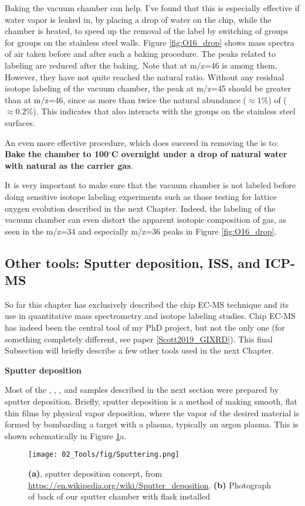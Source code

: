 Baking the vacuum chamber can help. I've found that this is especially effective if water vapor is leaked in, by placing a drop of water on the chip, while the chamber is heated, to speed up the removal of the  label by switching of  groups for  groups on the stainless steel walls. Figure \ref{fig:O16_drop} shows mass spectra of air taken before and after such a baking procedure. The peaks related to  labeling are reduced after the baking. Note that  at m/z=46 is among them. However, they have not quite reached the natural ratio. Without any residual isotope labeling of the vacuum chamber, the peak at m/z=45 should be greater than at m/z=46, since  as more than twice the natural abundance ($\approx 1$\%) of  ($\approx 0.2$\%). This indicates that  also interacts with the  groups on the stainless steel surfaces. 

An even more effective procedure, which does succeed in removing the  is to: \textbf{Bake the chamber to 100$^\circ$C overnight under a drop of natural water with natural  as the carrier gas}. 

It is very important to make sure that the vacuum chamber is not labeled before doing sensitive isotope labeling experiments such as those testing for lattice oxygen evolution described in the next Chapter. Indeed, the labeling of the vacuum chamber can even distort the apparent isotopic composition of  gas, as seen in the m/z=34 and especially m/z=36 peaks in Figure \ref{fig:O16_drop}.

\subsection{Other tools: Sputter deposition, ISS, and ICP-MS}\label{subsec:other_tools}

So far this chapter has exclusively described the chip EC-MS technique and its use in quantitative mass spectrometry and isotope labeling studies. Chip EC-MS has indeed been the central tool of my PhD project, but not the only one (for something completely different, see paper \ref{Scott2019_GIXRD}). This final Subsection will briefly describe a few other tools used in the next Chapter.

\vspace{5mm}
\textbf{Sputter deposition}

Most of the , , , and  samples described in the next section were prepared by sputter deposition. Briefly, sputter deposition is a method of making smooth, flat thin films by physical vapor deposition, where the vapor of the desired material is formed by bombarding a target with a plasma, typically an argon plasma. This is shown schematically in Figure \ref{fig:sputter}a. 
\begin{figure}[t]
	\centering
	\texttt{[image: 02\_Tools/fig/Sputtering.png]}
	\caption{\textbf{(a)}, sputter deposition concept, from \url{https://en.wikipedia.org/wiki/Sputter_deposition}. \textbf{(b)} Photograph of back of our sputter chamber with  flask installed }
	\label{fig:sputter}
\end{figure}

